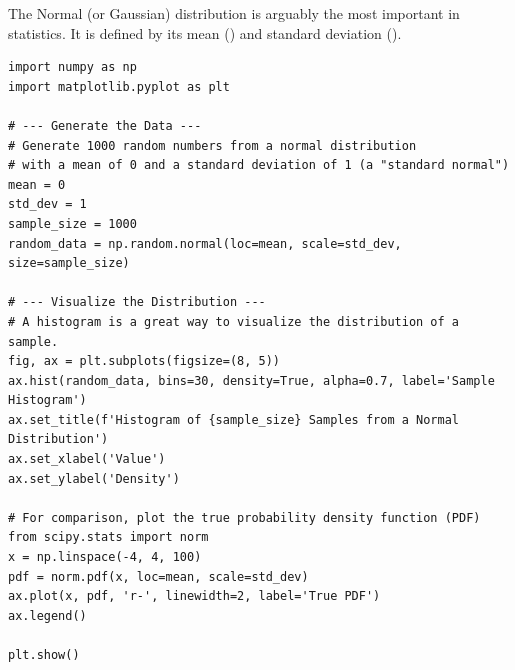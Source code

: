 \begin{example}
The Normal (or Gaussian) distribution is arguably the most important in statistics. It is defined by its mean () and standard deviation ().
\text{ }\begin{verbatim}
import numpy as np
import matplotlib.pyplot as plt

# --- Generate the Data ---
# Generate 1000 random numbers from a normal distribution
# with a mean of 0 and a standard deviation of 1 (a "standard normal")
mean = 0
std_dev = 1
sample_size = 1000
random_data = np.random.normal(loc=mean, scale=std_dev, size=sample_size)

# --- Visualize the Distribution ---
# A histogram is a great way to visualize the distribution of a sample.
fig, ax = plt.subplots(figsize=(8, 5))
ax.hist(random_data, bins=30, density=True, alpha=0.7, label='Sample Histogram')
ax.set_title(f'Histogram of {sample_size} Samples from a Normal Distribution')
ax.set_xlabel('Value')
ax.set_ylabel('Density')

# For comparison, plot the true probability density function (PDF)
from scipy.stats import norm
x = np.linspace(-4, 4, 100)
pdf = norm.pdf(x, loc=mean, scale=std_dev)
ax.plot(x, pdf, 'r-', linewidth=2, label='True PDF')
ax.legend()

plt.show()
\end{verbatim}
\end{example}